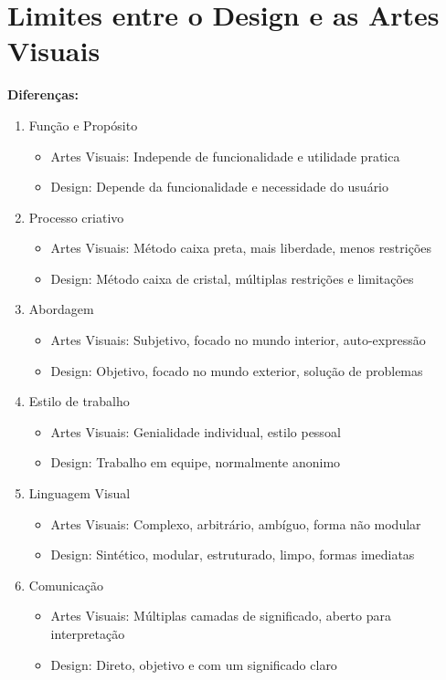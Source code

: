\documentclass{article}
\begin{document}
\newpage
\section{Limites entre o Design e as Artes Visuais}
\textbf{Diferenças:}
\begin{enumerate}
    \item Função e Propósito
    \begin{itemize}
        \item Artes Visuais: Independe de funcionalidade e utilidade pratica
        \item Design: Depende da funcionalidade e necessidade do usuário
    \end{itemize}
    \item Processo criativo
    \begin{itemize}
        \item Artes Visuais: Método caixa preta, mais liberdade, menos restrições
        \item Design: Método caixa de cristal, múltiplas restrições e limitações
    \end{itemize}
    \item Abordagem
    \begin{itemize}
        \item Artes Visuais: Subjetivo, focado no mundo interior, auto-expressão
        \item Design: Objetivo, focado no mundo exterior, solução de problemas
    \end{itemize}
    \item Estilo de trabalho
    \begin{itemize}
        \item Artes Visuais: Genialidade individual, estilo pessoal
        \item Design: Trabalho em equipe, normalmente anonimo
    \end{itemize}
    \item Linguagem Visual
    \begin{itemize}
        \item Artes Visuais: Complexo, arbitrário, ambíguo, forma não modular
        \item Design: Sintético, modular, estruturado, limpo, formas imediatas
    \end{itemize}
    \item Comunicação
    \begin{itemize}
        \item Artes Visuais: Múltiplas camadas de significado, aberto para interpretação
        \item Design: Direto, objetivo e com um significado claro
    \end{itemize}
\end{enumerate}
\end{document}
